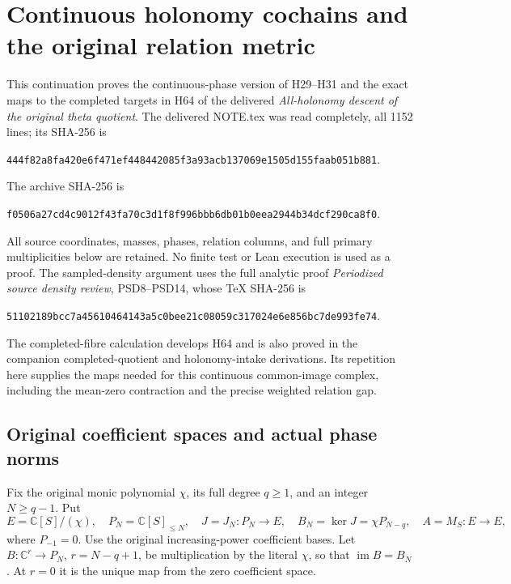 \begingroup
\def\C{\mathbb C}
\def\R{\mathbb R}
\def\av{\operatorname{av}}
\def\im{\operatorname{im}}
\section{Continuous holonomy cochains and the original relation metric}



This continuation proves the continuous-phase version of H29--H31
and the exact maps to the completed targets in H64 of the delivered
\emph{All-holonomy descent of the original theta quotient}.
The delivered NOTE.tex was read completely, all 1152 lines;
its SHA-256 is
\begin{center}\small
\texttt{444f82a8fa420e6f471ef448442085f3a93acb137069e1505d155faab051b881}.
\end{center}
The archive SHA-256 is
\begin{center}\small
\texttt{f0506a27cd4c9012f43fa70c3d1f8f996bbb6db01b0eea2944b34dcf290ca8f0}.
\end{center}
All source coordinates, masses, phases, relation columns, and full
primary multiplicities below are retained. No finite test or Lean
execution is used as a proof.
The sampled-density argument uses the full analytic proof
\emph{Periodized source density review}, PSD8--PSD14,
whose TeX SHA-256 is
\begin{center}\small
\texttt{51102189bcc7a45610464143a5c0bee21c08059c317024e6e856bc7de993fe74}.
\end{center}
The completed-fibre calculation develops H64 and is also proved
in the companion completed-quotient and holonomy-intake derivations.
Its repetition here supplies the maps needed for this continuous
common-image complex, including the mean-zero contraction and
the precise weighted relation gap.

\subsection{Original coefficient spaces and actual phase norms}

Fix the original monic polynomial $\chi$, its full degree $q\ge1$,
and an integer $N\ge q-1$. Put
\[
 E=\C[S]/(\chi),\quad P_N=\C[S]_{\le N},\quad
 J=J_N:P_N\longrightarrow E,\quad
 B_N=\ker J=\chi P_{N-q},\quad A=M_S:E\longrightarrow E,
 \tag{HCD1}
\]
where $P_{-1}=0$. Use the original increasing-power coefficient
bases. Let $B:\C^r\to P_N$, $r=N-q+1$, be multiplication by
the literal $\chi$, so that $\im B=B_N$. At $r=0$ it is the
unique map from the zero coefficient space.

